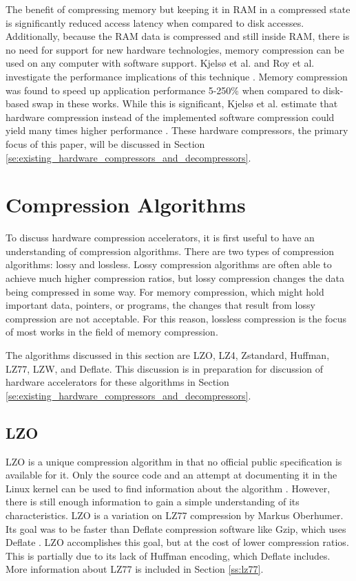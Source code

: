 \documentclass[doublespace,nopageskip]{VTthesis}
\begin{document}
The benefit of compressing memory but keeping it in RAM in a compressed state is significantly reduced access latency when compared to disk accesses. Additionally, because the RAM data is compressed and still inside RAM, there is no need for support for new hardware technologies, memory compression can be used on any computer with software support. Kjelsø et al. and Roy et al. investigate the performance implications of this technique \cite{memorycompressionperformance, compressedmemoryimproveperformance}. Memory compression was found to speed up application performance 5-250\% when compared to disk-based swap in these works. While this is significant, Kjelsø et al. estimate that hardware compression instead of the implemented software compression could yield many times higher performance \cite{memorycompressionperformance}. These hardware compressors, the primary focus of this paper, will be discussed in Section \ref{se:existing_hardware_compressors_and_decompressors}.

\section{Compression Algorithms}\label{se:compression_algorithms}
To discuss hardware compression accelerators, it is first useful to have an understanding of compression algorithms. There are two types of compression algorithms: lossy and lossless. Lossy compression algorithms are often able to achieve much higher compression ratios, but lossy compression changes the data being compressed in some way. For memory compression, which might hold important data, pointers, or programs, the changes that result from lossy compression are not acceptable. For this reason, lossless compression is the focus of most works in the field of memory compression.

The algorithms discussed in this section are LZO, LZ4, Zstandard, Huffman, LZ77, LZW, and Deflate. This discussion is in preparation for discussion of hardware accelerators for these algorithms in Section \ref{se:existing_hardware_compressors_and_decompressors}.

\subsection{LZO}\label{ss:lzo}
LZO is a unique compression algorithm in that no official public specification is available for it. Only the source code and an attempt at documenting it in the Linux kernel can be used to find information about the algorithm \cite{linuxlzo}. However, there is still enough information to gain a simple understanding of its characteristics. LZO is a variation on LZ77 compression by Markus Oberhumer. Its goal was to be faster than Deflate compression software like Gzip, which uses Deflate \cite{lzo}. LZO accomplishes this goal, but at the cost of lower compression ratios. This is partially due to its lack of Huffman encoding, which Deflate includes. More information about LZ77 is included in Section \ref{ss:lz77}.
\end{document}
